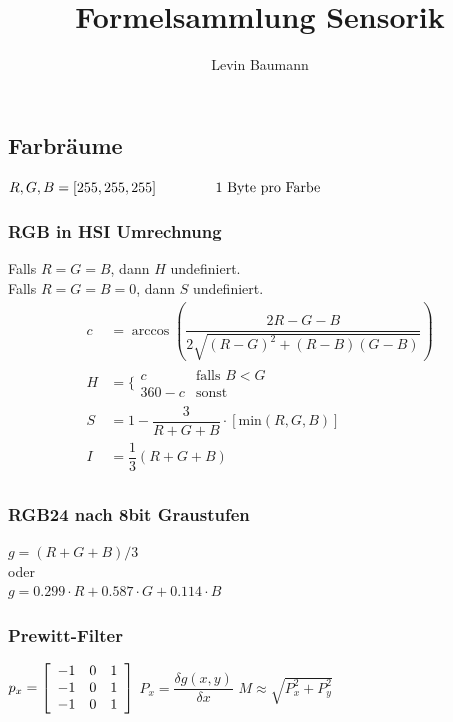 \documentclass[8pt,a4paper,landscape]{scrartcl}
\author{Levin Baumann}
\title{Formelsammlung Sensorik}
\begin{document}
 
\setlength{\columnsep}{1cm} 
\begin{multicols*}{3}

\subsection*{Farbräume}
$ R,G,B = [255, 255, 255] \text{\hspace{1.5cm}1 Byte pro Farbe}$

\subsubsection*{RGB in HSI Umrechnung}
\noindent
Falls $ R = G = B $, dann $ H $ undefiniert.\\
Falls $ R = G = B = 0 $, dann $ S $ undefiniert.
\begin{alignat*}{1}
	c &= \arccos\left(\dfrac{2R-G-B}{2\sqrt{(R-G)^2+(R-B)(G-B)}}\right)\\
	H &= \Bigg\{ \begin{matrix*}
			c & \text{falls } B<G\\
			360-c & \text{sonst}
		\end{matrix*}\\
	S &= 1 - \dfrac{3}{R+G+B}\cdot[\text{min}(R,G,B)]\\
	I &= \dfrac{1}{3}(R+G+B)\\
\end{alignat*}

\subsubsection*{RGB24 nach 8bit Graustufen}
$ g = (R + G + B) / 3 $\\
oder\\
$ g = 0.299\cdot R + 0.587\cdot G + 0.114\cdot B $\\

\subsubsection*{Prewitt-Filter}
$
p_x = \left[\begin{Array}{ccc}
	-1 & 0 & 1\\
	-1 & 0 & 1\\
	-1 & 0 & 1\\
\end{Array}\right]
$
\hspace{1cm}
$
P_x = \dfrac{\delta g(x,y)}{\delta x}
$
\hspace{1cm}
$ M \approx \sqrt{P_x^2 + P_y^2} $


\end{multicols*}
\end{document}

